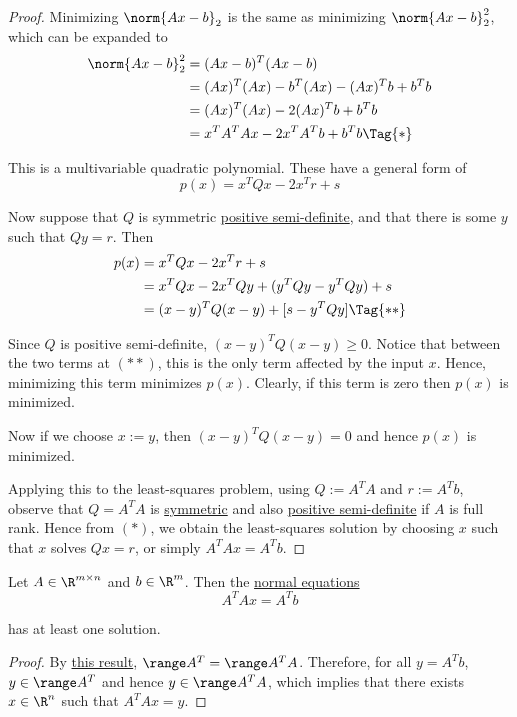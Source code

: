 \begin{proof}
  Minimizing $\norm{Ax-b}_2$ is the same as minimizing $\norm{Ax-b}_2^2$, which
  can be expanded to
  \begin{align*}
    \norm{Ax-b}_2^2 &=(Ax-b)^T(Ax-b)                  \\
                    &=(Ax)^T(Ax)-b^T(Ax)-(Ax)^Tb+b^Tb \\
                    &=(Ax)^T(Ax)-2(Ax)^Tb+b^Tb        \\
                    &=x^TA^TAx-2x^TA^Tb+b^Tb\Tag{*}
  \end{align*}

  This is a multivariable quadratic polynomial. These have a general form of
  $$
    p(x)=x^TQx-2x^Tr+s
  $$

  Now suppose that $Q$ is symmetric \href{e25e722}{positive semi-definite}, and
  that there is some $y$ such that $Qy=r$. Then
  \begin{align*}
    p(x) &=x^TQx-2x^Tr+s                   \\
         &=x^TQx-2x^TQy+(y^TQy-y^TQy)+s    \\
         &=(x-y)^TQ(x-y)+[s-y^TQy]\Tag{**}
  \end{align*}

  Since $Q$ is positive semi-definite, $(x-y)^TQ(x-y)\geq0$. Notice that
  between the two terms at $(**)$, this is the only term affected by the input
  $x$. Hence, minimizing this term minimizes $p(x)$. Clearly, if this term is
  zero then $p(x)$ is minimized.

  Now if we choose $x:=y$, then $(x-y)^TQ(x-y)=0$ and hence $p(x)$ is
  minimized.

  Applying this to the least-squares problem, using $Q:=A^TA$ and $r:=A^Tb$,
  observe that $Q=A^TA$ is \href{a1d41cd}{symmetric} and also
  \href{fd1f53e}{positive semi-definite} if $A$ is full rank. Hence from $(*)$,
  we obtain the least-squares solution by choosing $x$ such that $x$ solves
  $Qx=r$, or simply $A^TAx=A^Tb$.
\end{proof}

\label{e1ea52d}

Let $A\in\R^{m\times n}$ and $b\in\R^m$. Then the \href{b17beaa}{normal
equations}
$$
  A^TAx=A^Tb
$$

has at least one solution.

\begin{proof}
  By \href{a1227c1}{this result}, $\range A^T=\range A^TA$. Therefore, for all
  $y=A^Tb$, $y\in\range A^T$ and hence $y\in\range A^TA$, which implies that
  there exists $x\in\R^n$ such that $A^TAx=y$.
\end{proof}

